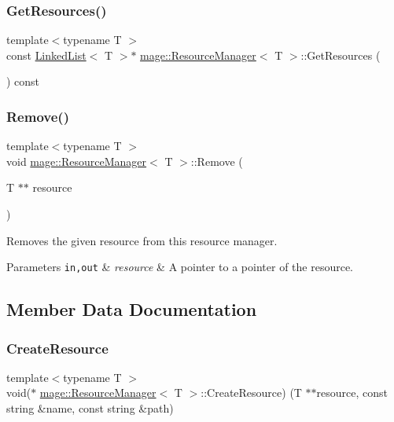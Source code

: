 \subsubsection{\texorpdfstring{Get\+Resources()}{GetResources()}}
{\footnotesize\ttfamily template$<$typename T $>$ \\
const \hyperlink{classmage_1_1_linked_list}{Linked\+List}$<$ T $>$$\ast$ \hyperlink{classmage_1_1_resource_manager}{mage\+::\+Resource\+Manager}$<$ T $>$\+::Get\+Resources (\begin{DoxyParamCaption}{ }\end{DoxyParamCaption}) const}

\hypertarget{classmage_1_1_resource_manager_a9fdc16b5f1627d0684c5a7e870290461}{}\label{classmage_1_1_resource_manager_a9fdc16b5f1627d0684c5a7e870290461} 
\subsubsection{\texorpdfstring{Remove()}{Remove()}}
{\footnotesize\ttfamily template$<$typename T $>$ \\
void \hyperlink{classmage_1_1_resource_manager}{mage\+::\+Resource\+Manager}$<$ T $>$\+::Remove (\begin{DoxyParamCaption}\item[{T $\ast$$\ast$}]{resource }\end{DoxyParamCaption})}

Removes the given resource from this resource manager.


\begin{DoxyParams}[1]{Parameters}
\mbox{\tt in,out}  & {\em resource} & A pointer to a pointer of the resource. \\
\hline
\end{DoxyParams}


\subsection{Member Data Documentation}
\hypertarget{classmage_1_1_resource_manager_a1175cdd82a5407dd099b53a432ca9a95}{}\label{classmage_1_1_resource_manager_a1175cdd82a5407dd099b53a432ca9a95} 
\subsubsection{\texorpdfstring{Create\+Resource}{CreateResource}}
{\footnotesize\ttfamily template$<$typename T $>$ \\
void($\ast$ \hyperlink{classmage_1_1_resource_manager}{mage\+::\+Resource\+Manager}$<$ T $>$\+::Create\+Resource) (T $\ast$$\ast$resource, const string \&name, const string \&path)\hspace{0.3cm}{\ttfamily [private]}}

